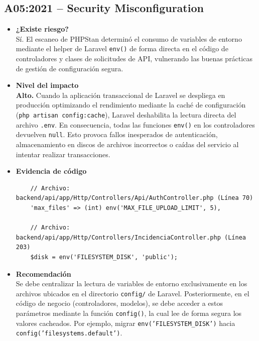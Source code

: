 \subsection{A05:2021 – Security Misconfiguration}

\begin{itemize}
    \item \textbf{¿Existe riesgo?} \\
    Sí. El escaneo de PHPStan determinó el consumo de variables de entorno mediante el helper de Laravel \texttt{env()} de forma directa en el código de controladores y clases de solicitudes de API, vulnerando las buenas prácticas de gestión de configuración segura.
    
    \item \textbf{Nivel del impacto} \\
    \textbf{Alto.} Cuando la aplicación transaccional de Laravel se despliega en producción optimizando el rendimiento mediante la caché de configuración (\texttt{php artisan config:cache}), Laravel deshabilita la lectura directa del archivo \texttt{.env}. En consecuencia, todas las funciones \texttt{env()} en los controladores devuelven \texttt{null}. Esto provoca fallos inesperados de autenticación, almacenamiento en discos de archivos incorrectos o caídas del servicio al intentar realizar transacciones.
    
    \item \textbf{Evidencia de código}
    \begin{verbatim}
    // Archivo: backend/api/app/Http/Controllers/Api/AuthController.php (Línea 70)
    'max_files' => (int) env('MAX_FILE_UPLOAD_LIMIT', 5),

    // Archivo: backend/api/app/Http/Controllers/IncidenciaController.php (Línea 203)
    $disk = env('FILESYSTEM_DISK', 'public');
    \end{verbatim}
    
    \item \textbf{Recomendación} \\
    Se debe centralizar la lectura de variables de entorno exclusivamente en los archivos ubicados en el directorio \texttt{config/} de Laravel. Posteriormente, en el código de negocio (controladores, modelos), se debe acceder a estos parámetros mediante la función \texttt{config()}, la cual lee de forma segura los valores cacheados. Por ejemplo, migrar \texttt{env('FILESYSTEM\_DISK')} hacia \texttt{config('filesystems.default')}.
\end{itemize}

